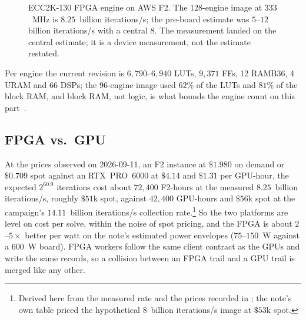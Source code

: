 \begin{figure}[t]
\centering
{}
\caption{ECC2K-130 FPGA engine on AWS F2. The 128-engine image at
  $333$~MHz is $8.25$~billion iterations/s; the pre-board estimate was
  $5$--$12$ billion iterations/s with a central $8$. The measurement landed on the
  central estimate; it is a device measurement, not the estimate
  restated.}
\label{fig:fpga}
\end{figure}

Per engine the current revision is $6{,}790$--$6{,}940$ LUTs, $9{,}371$
FFs, 12 RAMB36, 4 URAM and 66 DSPs; the 96-engine image used $62\%$ of
the LUTs and $81\%$ of the block RAM, and block RAM, not logic, is
what bounds the engine count on this part~.

\subsection{FPGA vs.\ GPU}
\label{sec:fpga-vs-gpu}

At the prices observed on 2026-09-11, an F2 instance at $\$1.980$
on demand or $\$0.709$ spot against an RTX~PRO~6000 at $\$4.14$ and
$\$1.31$ per GPU-hour, the expected $2^{60.9}$ iterations cost about $72{,}400$
F2-hours at the measured $8.25$~billion iterations/s, roughly $\$51$k spot, against
$42{,}400$ GPU-hours and $\$56$k spot at the campaign's $14.11$~billion iterations/s
collection rate.\footnote{Derived here from the measured rate and the
prices recorded in ; the note's own
table priced the hypothetical $8$~billion iterations/s image at $\$53$k spot.} So
the two platforms are level on cost per solve, within the noise of spot
pricing, and the FPGA is about $2$--$5\times$ better per watt on the
note's estimated power envelopes ($75$--$150$~W against a $600$~W
board). FPGA workers follow the same client contract as the GPUs and
write the same records, so a collision between an FPGA trail and a GPU
trail is merged like any other.
